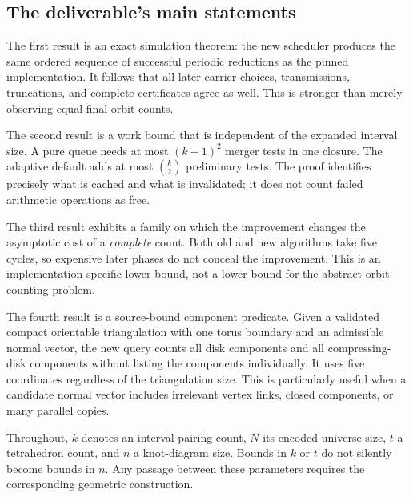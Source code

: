 \subsection{The deliverable's main statements}

The first result is an exact simulation theorem: the new scheduler produces
the same ordered sequence of successful periodic reductions as the pinned
implementation. It follows that all later carrier choices, transmissions,
truncations, and complete certificates agree as well. This is stronger than
merely observing equal final orbit counts.

The second result is a work bound that is independent of the expanded
interval size. A pure queue needs at most \((k-1)^2\) merger tests in one
closure. The adaptive default adds at most \(\binom{k}{2}\) preliminary
tests. The proof identifies precisely what is cached and what is invalidated;
it does not count failed arithmetic operations as free.

The third result exhibits a family on which the improvement changes
the asymptotic cost of a \emph{complete} count. Both old and new algorithms
take five cycles, so expensive later phases do not conceal the improvement.
This is an implementation-specific lower bound, not a lower bound for the
abstract orbit-counting problem.

The fourth result is a source-bound component predicate. Given a validated
compact orientable triangulation with one torus boundary and an admissible
normal vector, the new query counts all disk components and all
compressing-disk components without listing the components individually.
It uses five coordinates regardless of the triangulation size. This is
particularly useful when a candidate normal vector includes irrelevant
vertex links, closed components, or many parallel copies.

Throughout, \(k\) denotes an interval-pairing count, \(N\) its encoded
universe size, \(t\) a tetrahedron count, and \(n\) a knot-diagram size.
Bounds in \(k\) or \(t\) do not silently become bounds in \(n\). Any passage
between these parameters requires the corresponding geometric construction.
